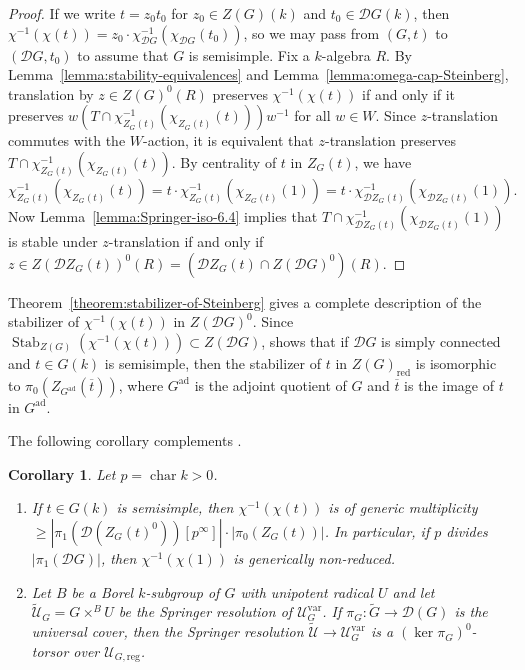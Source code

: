 \documentclass[11pt,reqno]{amsart}
\newtheorem{cor}[theorem]{Corollary}
\theoremstyle{definition}
\renewcommand{\rm}{\mathrm}
\newcommand{\sD}{{\mathscr D}}
\newcommand{\sU}{{\mathscr U}}
\DeclareMathOperator{\chara}{char}
\DeclareMathOperator{\Stab}{Stab}
\newcommand{\ov}[1]{\overline{#1}}
\begin{document}
\begin{proof}
    If we write $t = z_0t_0$ for $z_0 \in Z(G)(k)$ and $t_0 \in \sD G(k)$, then $\chi^{-1}(\chi(t)) = z_0 \cdot \chi_{\sD G}^{-1}(\chi_{\sD G}(t_0))$, so we may pass from $(G, t)$ to $(\sD G, t_0)$ to assume that $G$ is semisimple. Fix a $k$-algebra $R$. By Lemma~\ref{lemma:stability-equivalences} and Lemma~\ref{lemma:omega-cap-Steinberg}, translation by $z \in Z(G)^0(R)$ preserves $\chi^{-1}(\chi(t))$ if and only if it preserves $w(T \cap \chi_{Z_G(t)}^{-1}(\chi_{Z_G(t)}(t)))w^{-1}$ for all $w \in W$. Since $z$-translation commutes with the $W$-action, it is equivalent that $z$-translation preserves $T \cap \chi_{Z_G(t)}^{-1}(\chi_{Z_G(t)}(t))$. By centrality of $t$ in $Z_G(t)$, we have
    \[
    \chi_{Z_G(t)}^{-1}(\chi_{Z_G(t)}(t)) = t \cdot \chi_{Z_G(t)}^{-1}(\chi_{Z_G(t)}(1)) = t \cdot \chi_{\sD Z_G(t)}^{-1}(\chi_{\sD Z_G(t)}(1)).
    \]
    Now Lemma~\ref{lemma:Springer-iso-6.4} implies that $T \cap \chi_{\sD Z_G(t)}^{-1}(\chi_{\sD Z_G(t)}(1))$ is stable under $z$-translation if and only if $z \in Z(\sD Z_G(t))^0(R) = (\sD Z_G(t) \cap Z(\sD G)^0)(R)$.
\end{proof}

Theorem~\ref{theorem:stabilizer-of-Steinberg} gives a complete description of the stabilizer of $\chi^{-1}(\chi(t))$ in $Z(\sD G)^0$. Since $\Stab_{Z(G)}(\chi^{-1}(\chi(t))) \subset Z(\sD G)$, \cite[Theorem 9.1]{SteinbergEndomorphisms} shows that if $\sD G$ is simply connected and $t \in G(k)$ is semisimple, then the stabilizer of $t$ in $Z(G)_{\rm{red}}$ is isomorphic to $\pi_0(Z_{G^{\rm{ad}}}(\ov{t}))$, where $G^{\rm{ad}}$ is the adjoint quotient of $G$ and $\ov{t}$ is the image of $t$ in $G^{\rm{ad}}$.

The following corollary complements \cite[Lemma 4.4]{Integral-Springer}.

\begin{cor}\label{cor:unip-small-char}
Let $p = \chara k > 0$.
\begin{enumerate}
	\item\label{item:chi-unipotent-variety-non-reduced} If $t \in G(k)$ is semisimple, then $\chi^{-1}(\chi(t))$ is of generic multiplicity $\geq |\pi_1(\sD(Z_G(t)^0))[p^\infty]|\cdot |\pi_0(Z_G(t))|$. In particular, if $p$ divides $|\pi_1(\sD G)|$, then $\chi^{-1}(\chi(1))$ is generically non-reduced.
    \item\label{item:springer-resolution-generically-torsor} Let $B$ be a Borel $k$-subgroup of $G$ with unipotent radical $U$ and let $\widetilde{\sU}_G = G \times^B U$ be the Springer resolution of $\sU_G^{\rm{var}}$. If $\pi_G: \widetilde{G} \to \sD(G)$ is the universal cover, then the Springer resolution $\widetilde{\sU} \to \sU_G^{\rm{var}}$ is a $(\ker \pi_G)^0$-torsor over $\sU_{G, \rm{reg}}$.
\end{enumerate}
\end{cor}
\end{document}
